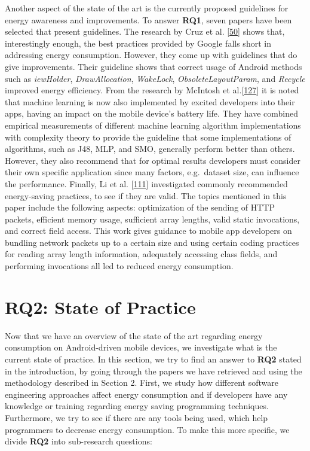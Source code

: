 \documentclass[]{book}
\begin{document}
Another aspect of the state of the art is the currently proposed
guidelines for energy awareness and improvements. To answer
\textbf{RQ1}, seven papers have been selected that present guidelines.
The research by Cruz et al. {[}\protect\hyperlink{ref-CA2017}{50}{]}
shows that, interestingly enough, the best practices provided by Google
falls short in addressing energy consumption. However, they come up with
guidelines that do give improvements. Their guideline shows that correct
usage of Android methods such as \emph{iewHolder},
\emph{DrawAllocation}, \emph{WakeLock}, \emph{ObsoleteLayoutParam}, and
\emph{Recycle} improved energy efficiency. From the research by McIntosh
et al.{[}\protect\hyperlink{ref-MSA2018}{127}{]} it is noted that
machine learning is now also implemented by excited developers into
their apps, having an impact on the mobile device's battery life. They
have combined empirical measurements of different machine learning
algorithm implementations with complexity theory to provide the
guideline that some implementations of algorithms, such as J48, MLP, and
SMO, generally perform better than others. However, they also recommend
that for optimal results developers must consider their own specific
application since many factors, e.g.~dataset size, can influence the
performance. Finally, Li et al.
{[}\protect\hyperlink{ref-LH2014}{111}{]} investigated commonly
recommended energy-saving practices, to see if they are valid. The
topics mentioned in this paper include the following aspects:
optimization of the sending of HTTP packets, efficient memory usage,
sufficient array lengths, valid static invocations, and correct field
access. This work gives guidance to mobile app developers on bundling
network packets up to a certain size and using certain coding practices
for reading array length information, adequately accessing class fields,
and performing invocations all led to reduced energy consumption.

\section{RQ2: State of Practice}\label{rq2-state-of-practice}

Now that we have an overview of the state of the art regarding energy
consumption on Android-driven mobile devices, we investigate what is the
current state of practice. In this section, we try to find an answer to
\textbf{RQ2} stated in the introduction, by going through the papers we
have retrieved and using the methodology described in Section 2. First,
we study how different software engineering approaches affect energy
consumption and if developers have any knowledge or training regarding
energy saving programming techniques. Furthermore, we try to see if
there are any tools being used, which help programmers to decrease
energy consumption. To make this more specific, we divide \textbf{RQ2}
into sub-research questions:
\end{document}
